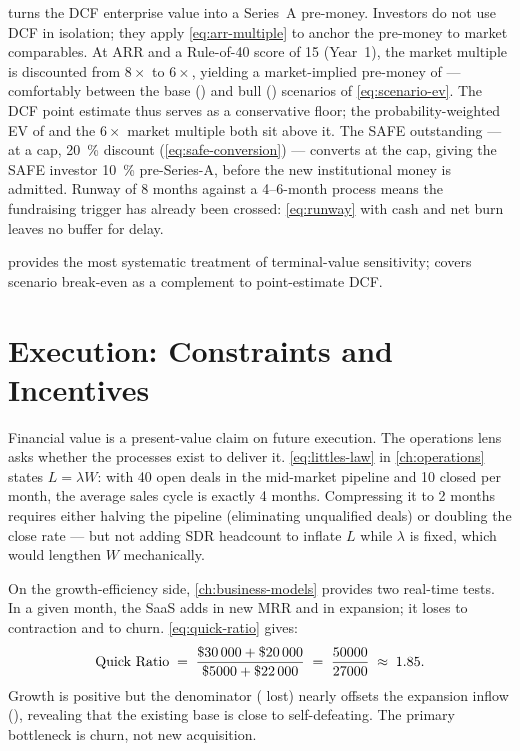  turns the  DCF enterprise value into a
Series~A pre-money. Investors do not use DCF in isolation; they apply \cref{eq:arr-multiple}
to anchor the pre-money to market comparables. At ARR  and a Rule-of-40 score
of 15 (Year~1), the market multiple is discounted from \(8\times\) to \(6\times\), yielding a
market-implied pre-money of  --- comfortably between the base ()
and bull () scenarios of \cref{eq:scenario-ev}. The  DCF
point estimate thus serves as a conservative floor; the probability-weighted EV of
 and the \(6\times\) market multiple both sit above it. The SAFE outstanding
---  at a  cap, \qty{20}{\percent} discount (\cref{eq:safe-conversion})
--- converts at the cap, giving the SAFE investor \qty{10}{\percent} pre-Series-A, before the
new institutional money is admitted. Runway of 8 months against a 4--6-month process means the
fundraising trigger has already been crossed: \cref{eq:runway} with  cash and
 net burn leaves no buffer for delay.

\textcite{damodaran2012} provides the most systematic treatment of terminal-value sensitivity;
\textcite{brealey2020} covers scenario break-even as a complement to point-estimate DCF.

\section{Execution: Constraints and Incentives}\label{sec:capstone-execution}

Financial value is a present-value claim on future execution. The operations lens asks
whether the processes exist to deliver it. \cref{eq:littles-law} in \cref{ch:operations}
states \(L = \lambda W\): with 40 open deals in the mid-market pipeline and 10 closed per
month, the average sales cycle is exactly 4 months. Compressing it to 2 months requires
either halving the pipeline (eliminating unqualified deals) or doubling the close rate ---
but not adding SDR headcount to inflate \(L\) while \(\lambda\) is fixed, which would
lengthen \(W\) mechanically.

On the growth-efficiency side, \cref{ch:business-models} provides two real-time tests.
In a given month, the SaaS adds  in new MRR and  in expansion;
it loses  to contraction and  to churn. \cref{eq:quick-ratio} gives:
\[
  \text{Quick Ratio} \;=\; \frac{\$\num{30000}+\$\num{20000}}{\$\num{5000}+\$\num{22000}}
    \;=\; \frac{50000}{27000} \;\approx\; 1.85.
\]
Growth is positive but the denominator ( lost) nearly offsets the expansion
inflow (), revealing that the existing base is close to self-defeating. The
primary bottleneck is churn, not new acquisition.

